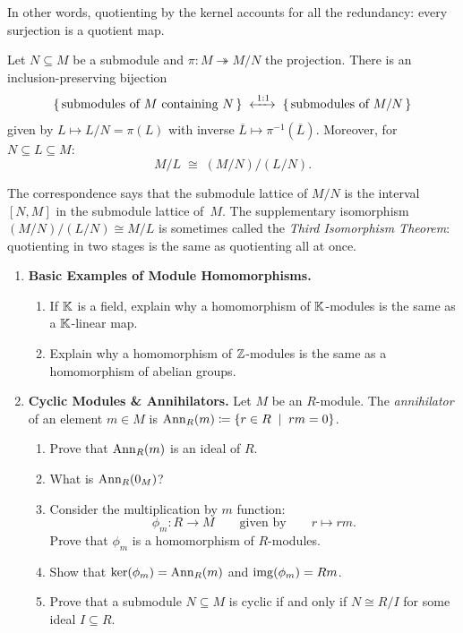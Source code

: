\documentclass[12pt,reqno]{amsart}
\begin{document}
In other words, quotienting by the kernel accounts for all the redundancy: every surjection is a quotient map.
  
\begin{theorem}
  Let $N \subseteq M$ be a submodule and $\pi \colon M \twoheadrightarrow M/N$ the projection.  There is an inclusion-preserving bijection
  \[
    \left\{\, \text{submodules of } M \text{ containing } N \,\right\}
    \;\xleftrightarrow{\;1:1\;}\;
    \left\{\, \text{submodules of } M/N \,\right\}
  \]
  given by $L \mapsto L/N = \pi(L)$ with inverse $\overline{L} \mapsto \pi^{-1}(\overline{L})$.  Moreover, for $N \subseteq L \subseteq M$:
  \[
    M/L \;\cong\; (M/N)\big/(L/N).
  \]
\end{theorem}
 
  The correspondence says that the submodule lattice of $M/N$ is the interval $[N, M]$ in the submodule lattice of~$M$.  The supplementary isomorphism $(M/N)/(L/N) \cong M/L$ is sometimes called the \emph{Third Isomorphism Theorem}: quotienting in two stages is the same as quotienting all at once.
 

\hrulefill

\begin{enumerate}[leftmargin=*, resume=problems]
\item \textbf{Basic Examples of Module Homomorphisms.} 
	\begin{enumerate}
		\item If $\mathbb{K}$ is a field, explain why a homomorphism of $\mathbb{K}$-modules is the same as a $\mathbb{K}$-linear map. 
		\item Explain why a homomorphism of $\mathbb{Z}$-modules is the same as a homomorphism of abelian groups. 
	\end{enumerate} 

\item \textbf{Cyclic Modules \& Annihilators.} Let $M$ be an $R$-module. The \emph{annihilator} of an element $m\in M$ is $\operatorname{Ann}_{R}(m)\coloneqq \{r \in R\;\mid\; rm = 0 \}$. 
	\begin{enumerate}
	\item Prove that $\operatorname{Ann}_{R}(m)$ is an ideal of $R$.
	\item What is $\operatorname{Ann}_{R}(0_{M})$?
	\item Consider the multiplication by $m$ function: 
	\[
	\phi_{m}:R \to M \quad \quad \text{given by} \quad \quad r \mapsto rm.
	\]
	Prove that $\phi_{m}$ is a homomorphism of $R$-modules.
	\item Show that $\ker(\phi_m)=\operatorname{Ann}_{R}(m)$ and $\operatorname{img}(\phi_m)=Rm$. 
	\item Prove that a submodule $N \subseteq M$ is cyclic if and only if $N \cong R/I$ for some ideal $I \subseteq R$. 
	\end{enumerate}
\end{enumerate}
\end{document}

